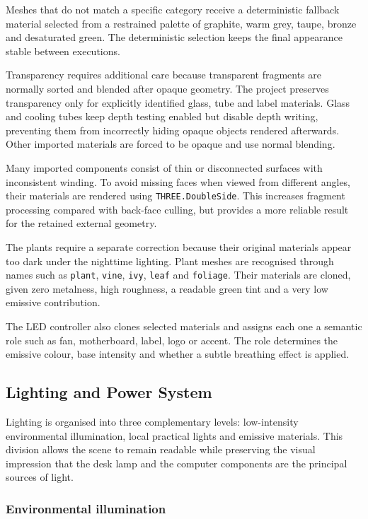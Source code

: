\documentclass{report}
\begin{document}
Meshes that do not match a specific category receive a deterministic
fallback material selected from a restrained palette of graphite, warm
grey, taupe, bronze and desaturated green. The deterministic selection
keeps the final appearance stable between executions.

Transparency requires additional care because transparent fragments are
normally sorted and blended after opaque geometry. The project preserves
transparency only for explicitly identified glass, tube and label
materials. Glass and cooling tubes keep depth testing enabled but disable
depth writing, preventing them from incorrectly hiding opaque objects
rendered afterwards. Other imported materials are forced to be opaque
and use normal blending.

Many imported components consist of thin or disconnected surfaces with
inconsistent winding. To avoid missing faces when viewed from different
angles, their materials are rendered using
\texttt{THREE.DoubleSide}. This increases fragment processing compared
with back-face culling, but provides a more reliable result for the
retained external geometry.

The plants require a separate correction because their original
materials appear too dark under the nighttime lighting. Plant meshes are
recognised through names such as \texttt{plant}, \texttt{vine},
\texttt{ivy}, \texttt{leaf} and \texttt{foliage}. Their materials are
cloned, given zero metalness, high roughness, a readable green tint and
a very low emissive contribution.

The LED controller also clones selected materials and assigns each one a
semantic role such as fan, motherboard, label, logo or accent. The role
determines the emissive colour, base intensity and whether a subtle
breathing effect is applied.



\subsection{Lighting and Power System}

Lighting is organised into three complementary levels: low-intensity
environmental illumination, local practical lights and emissive
materials. This division allows the scene to remain readable while
preserving the visual impression that the desk lamp and the computer
components are the principal sources of light.

\subsubsection{Environmental illumination}
\end{document}
